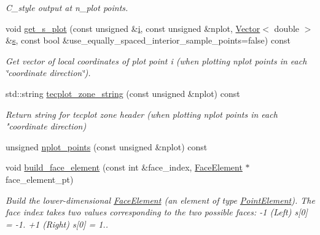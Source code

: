 \begin{DoxyCompactItemize}
\begin{DoxyCompactList}\small\item\em C\+\_\+style output at n\+\_\+plot points. \end{DoxyCompactList}\item 
void \hyperlink{classoomph_1_1TElement_3_011_00_01NNODE__1D_01_4_a4f438dcbac105993fee93a367d69f163}{get\+\_\+s\+\_\+plot} (const unsigned \&\hyperlink{cfortran_8h_adb50e893b86b3e55e751a42eab3cba82}{i}, const unsigned \&nplot, \hyperlink{classoomph_1_1Vector}{Vector}$<$ double $>$ \&\hyperlink{cfortran_8h_ab7123126e4885ef647dd9c6e3807a21c}{s}, const bool \&use\+\_\+equally\+\_\+spaced\+\_\+interior\+\_\+sample\+\_\+points=false) const
\begin{DoxyCompactList}\small\item\em Get vector of local coordinates of plot point i (when plotting nplot points in each \char`\"{}coordinate direction\char`\"{}). \end{DoxyCompactList}\item 
std\+::string \hyperlink{classoomph_1_1TElement_3_011_00_01NNODE__1D_01_4_a22009472036b36ba8291fe72bd5da457}{tecplot\+\_\+zone\+\_\+string} (const unsigned \&nplot) const
\begin{DoxyCompactList}\small\item\em Return string for tecplot zone header (when plotting nplot points in each "coordinate direction) \end{DoxyCompactList}\item 
unsigned \hyperlink{classoomph_1_1TElement_3_011_00_01NNODE__1D_01_4_a3a5ba5b2fd7ab5fffdddf10b07b00ed7}{nplot\+\_\+points} (const unsigned \&nplot) const
\item 
void \hyperlink{classoomph_1_1TElement_3_011_00_01NNODE__1D_01_4_af114adb1980d2863b72b9372bc058e3c}{build\+\_\+face\+\_\+element} (const int \&face\+\_\+index, \hyperlink{classoomph_1_1FaceElement}{Face\+Element} $\ast$face\+\_\+element\+\_\+pt)
\begin{DoxyCompactList}\small\item\em Build the lower-\/dimensional \hyperlink{classoomph_1_1FaceElement}{Face\+Element} (an element of type \hyperlink{classoomph_1_1PointElement}{Point\+Element}). The face index takes two values corresponding to the two possible faces\+: -\/1 (Left) s\mbox{[}0\mbox{]} = -\/1. +1 (Right) s\mbox{[}0\mbox{]} = 1.. \end{DoxyCompactList}\end{DoxyCompactItemize}
